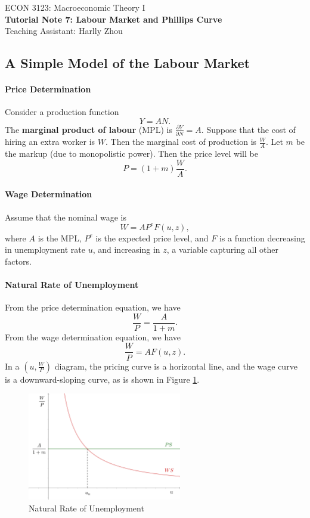 \documentclass[12pt]{article}
\begin{document}
\begin{center}
    ECON 3123: Macroeconomic Theory I\\
    {\large \textbf{Tutorial Note 7: Labour Market and Phillips Curve}}\\
    Teaching Assistant: Harlly Zhou
\end{center}

\subsection*{A Simple Model of the Labour Market}
\paragraph{Price Determination} Consider a production function
\[Y = AN.\]
The \textbf{marginal product of labour} (MPL) is $\frac{\partial Y}{\partial N} = A$. Suppose that the cost of hiring an extra worker is $W$. Then the marginal cost of production is $\frac{W}{A}$. Let $m$ be the markup (due to monopolistic power). Then the price level will be
\[ P = (1+m)\frac{W}{A}.\]

\paragraph{Wage Determination} Assume that the nominal wage is
\[W = A P^e F(u,z),\]
where $A$ is the MPL, $P^e$ is the expected price level, and $F$ is a function decreasing in unemployment rate $u$, and increasing in $z$, a variable capturing all other factors.

\paragraph{Natural Rate of Unemployment} From the price determination equation, we have
\[\frac{W}{P} = \frac{A}{1+m}.\]
From the wage determination equation, we have
\[\frac{W}{P} = AF(u,z).\]
In a $\left(u, \frac{W}{P}\right)$ diagram, the pricing curve is a horizontal line, and the wage curve is a downward-sloping curve, as is shown in Figure \ref{fig:wu_01}.

\begin{figure}[htp]
    \centering
    \includegraphics[width=0.6\textwidth]{wu_01.png}
    \caption{Natural Rate of Unemployment}
    \label{fig:wu_01}
\end{figure}
\end{document}
